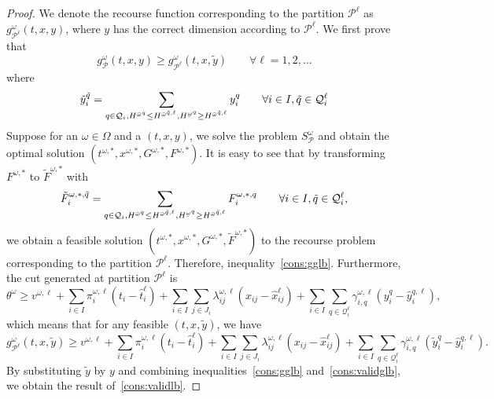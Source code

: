 \documentclass[11pt]{article}
\renewcommand{\underbar}{\underaccent{\bar}}
\begin{document}
	\begin{proof}
		We denote the recourse function corresponding to the partition \(\mathcal{P}^{\ell}\) as \(g^\omega_{\mathcal{P}^\ell}(t,x,y)\), where \(y\) has the correct dimension according to \(\mathcal{P}^\ell\). We first prove that 
		\begin{equation} \label{cons:gglb}
			g^\omega_{\mathcal{P}}(t,x,y) \geq g^{\omega}_{\mathcal{P}^\ell}(t,x,\tilde{y}) \qquad \forall \ell = 1,2,\dots
		\end{equation}
		where \[\tilde{y}_i^{\tilde{q}} = \sum_{q \in \mathcal{Q}_i, H^{\bar{\omega}^{q}} \leq H^{\bar{\omega}^{\tilde{q},\ell}},H^{\underbar{\omega}^{q}} \geq H^{\bar{\omega}^{\tilde{q},\ell}} }y_i^{q} \qquad  \forall i \in I, \tilde{q} \in \mathcal{Q}^\ell_i\]
		Suppose for an \(\omega \in \Omega\) and a \((t,x,y)\), we solve the problem \(S_{\mathcal{P}}^\omega\) and obtain the optimal solution \((t^{\omega,*},x^{\omega,*},G^{\omega,*},F^{\omega,*})\). It is easy to see that by transforming \(F^{\omega,*}\) to \(\tilde{F}^{\omega,*}\) with \[\tilde{F}^{\omega,*,\tilde{q}}_i = \sum_{q \in \mathcal{Q}_i, H^{\bar{\omega}^{q}} \leq H^{\bar{\omega}^{\tilde{q},\ell}},H^{\underbar{\omega}^{q}} \geq H^{\bar{\omega}^{\tilde{q},\ell}} }F_i^{\omega,*,q} \qquad  \forall i \in I, \tilde{q} \in \mathcal{Q}^\ell_i,\]
		we obtain a feasible solution \((t^{\omega,*},x^{\omega,*},G^{\omega,*},\tilde{F}^{\omega,*})\) to the recourse problem corresponding to the partition \(\mathcal{P}^\ell\). Therefore, inequality~\eqref{cons:gglb}. Furthermore, the cut generated at partition \(\mathcal{P}^\ell\) is
		\[\theta^\omega \geq v^{\omega,\ell} + \sum_{i \in I} \pi_i^{\omega,\ell} (t_i - \hat{t}_i^{\ell}) + \sum_{i \in I} \sum_{j \in J_i} \lambda_{ij}^{\omega,\ell} (x_{ij} - \hat{x}_{ij}^{\ell}) + \sum_{i \in I} \sum_{q \in \mathcal{Q}^{\ell}_i} \gamma_{i,q}^{\omega,\ell} \left( y_i^{q} - \hat{y}_i^{q,\ell} \right),\]
		 which means that for any feasible \((t,x,\tilde{y})\), we have 
		 \begin{equation} \label{cons:validglb}
		 	g^\omega_{\mathcal{P}^\ell}(t,x,\tilde{y}) \geq v^{\omega,\ell} + \sum_{i \in I} \pi_i^{\omega,\ell} (t_i - \hat{t}_i^{\ell}) + \sum_{i \in I} \sum_{j \in J_i} \lambda_{ij}^{\omega,\ell} (x_{ij} - \hat{x}_{ij}^{\ell}) + \sum_{i \in I} \sum_{q \in \mathcal{Q}^{\ell}_i} \gamma_{i,q}^{\omega,\ell} \left( \tilde{y}_i^{q} - \hat{y}_i^{q,\ell} \right).
		 \end{equation}
		 By substituting \(\tilde{y}\) by \(y\) and combining inequalities~\eqref{cons:gglb} and~\eqref{cons:validglb}, we obtain the result of~\eqref{cons:validlb}.
	\end{proof}
\end{document}
